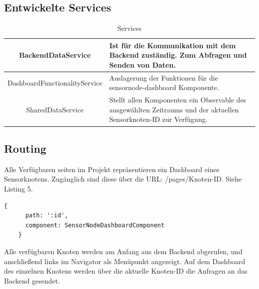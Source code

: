\subsection{Entwickelte Services}

\renewcommand{\arraystretch}{2}
\begin{table}[ht!]
  \centering
  \begin{tabular}{|c|p{4.4cm}|}
	\hline
	BackendDataService & Ist für die Kommunikation mit dem Backend zuständig. Zum Abfragen und Senden von Daten. \\
	\hline
	DashboardFunctionalityService & Auslagerung der Funktionen für die sensornode-dashboard Komponente. \\
	\hline
	SharedDataService & Stellt allen Komponenten ein Observable des ausgewählten Zeitraums und der aktuellen Sensorknoten-ID zur Verfügung. \\
	\hline
  \end{tabular}
  \caption{Services}
  \label{tab:beispiel}
\end{table}

\subsection{Routing}
Alle Verfügbaren seiten im Projekt repräsentieren ein Dashboard eines Sensorknotens.
Zugänglich sind diese über die URL: /pages/{Knoten-ID}. Siehe Listing 5.
\begin{lstlisting}[caption={Knoten-ID Routing},captionpos=b,showstringspaces=false, basicstyle=\small,label={lst:sensor_dtype}]
    {
      path: ':id',
      component: SensorNodeDashboardComponent
    }
\end{lstlisting}
Alle verfügbaren Knoten werden am Anfang aus dem Backend abgerufen, und anschließend links im Navigator als Menüpunkt angezeigt. Auf dem Dashboard des einzelnen Knotens werden über die aktuelle Knoten-ID die Anfragen an das Backend gesendet.